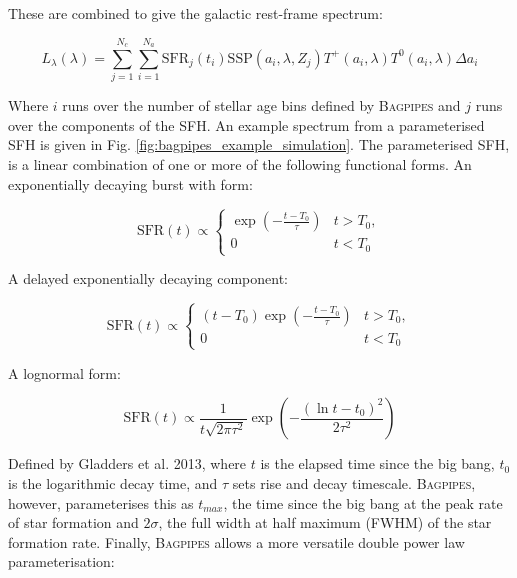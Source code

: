 \documentclass[a4paper,11pt]{article}
\begin{document}
\noindent These are combined to give the galactic rest-frame spectrum:

\begin{equation}\label{eq:luminosity_per_rframe_wavelength}
  L_\lambda(\lambda) =
  \sum_{j=1}^{N_c} \sum_{i=1}^{N_a}
  \mathrm{SFR}_j(t_i)
  \mathrm{SSP}(a_i,\lambda,Z_j)
  T^+(a_i,\lambda)
  T^0(a_i,\lambda)
  \Delta a_i
\end{equation}

\noindent Where $i$ runs over the number of stellar age bins defined by \textsc{Bagpipes} and $j$ runs over the components of the SFH.\cite{Carnall_2018} An example spectrum from a parameterised SFH is given in Fig. \ref{fig:bagpipes_example_simulation}. The parameterised SFH, is a linear combination of one or more of the following functional forms. An exponentially decaying burst with form:

\begin{equation}\label{eq:tau_model}
  \mathrm{SFR}(t) \propto
  \begin{cases}
    \exp\left({-\frac{t-T_0}{\tau}}\right) & t > T_0, \\
    0 & t < T_0
  \end{cases}
\end{equation}

\noindent A delayed exponentially decaying component:

\begin{equation}\label{eq:delayed_model}
  \mathrm{SFR}(t) \propto
  \begin{cases}
    (t-T_0)\exp\left({-\frac{t-T_0}{\tau}}\right) & t > T_0, \\
    0 & t < T_0
  \end{cases}
\end{equation}

\noindent A lognormal form:

\begin{equation}\label{eq:lognormal_model}
  \mathrm{SFR}(t) \propto
  \frac{1}{t\sqrt{2\pi\tau^2}}
  \exp\left({-\frac{\left(\ln{t-t_0}\right)^2}{2\tau^2}}\right)
\end{equation}

\noindent Defined by Gladders et al. 2013, where $t$ is the elapsed time since the big bang, $t_0$ is the logarithmic decay time, and $\tau$ sets rise and decay timescale.\cite{Gladders_2013} \textsc{Bagpipes}, however, parameterises this as $t_{max}$, the time since the big bang at the peak rate of star formation and $2\sigma$, the full width at half maximum (FWHM) of the star formation rate.\cite{Carnall_2019b} Finally, \textsc{Bagpipes} allows a more versatile double power law parameterisation:
\end{document}
